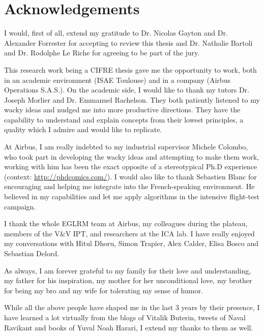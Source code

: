 \chapter*{Acknowledgements}
I would, first of all, extend my gratitude to Dr. Nicolas Gayton and Dr. Alexander Forrester for accepting to review this thesis and Dr. Nathalie Bartoli and Dr. Rodolphe Le Riche for agreeing to be part of the jury. 

This research work being a CIFRE thesis gave me the opportunity to work, both in an academic environment (ISAE Toulouse) and in a company (Airbus Operations S.A.S.). On the academic side, I would like to thank my tutors Dr. Joseph Morlier and  Dr. Emmanuel Rachelson. They both patiently listened to my wacky ideas and nudged me into more productive directions. They have the capability to understand and explain concepts from their lowest principles, a quality which I admire and would like to replicate.  

At Airbus, I am really indebted to my industrial supervisor Michele Colombo, who took part in developing the wacky ideas and attempting to make them work, working with him has been the exact opposite of a stereotypical Ph.D experience (context: \url{http://phdcomics.com/}). I would also like to thank Sebastien Blanc for encouraging and helping me integrate into the French-speaking environment. He believed in my capabilities and let me apply algorithms in the intensive flight-test campaign. 

I thank the whole EGLRM team at Airbus, my colleagues during the plateau, members of the V\&V IPT, and researchers at the ICA lab. I have really enjoyed my conversations with Hitul Dhoru, Simon Trapier, Alex Calder, Elisa Bosco and Sebastian Delord. 

As always, I am forever grateful to my family for their love and understanding, my father for his inspiration, my mother for her unconditional love, my brother for being my bro and my wife for tolerating my sense of humor. 

While all the above people have shaped me in the last 3 years by their presence, I have learned a lot virtually from the blogs of Vitalik Buterin, tweets of Naval Ravikant and books of Yuval Noah Harari, I extend my thanks to them as well. 